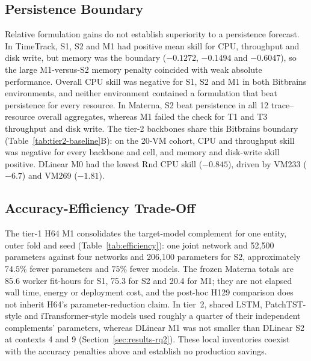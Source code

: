 \documentclass[5p,twocolumn]{elsarticle}
\begin{document}
\subsection{Persistence Boundary}
\label{sec:results-persistence}

Relative formulation gains do not establish superiority to a persistence
forecast. In TimeTrack, S1, S2 and M1 had positive mean skill for CPU,
throughput and disk write, but memory was the boundary ($-0.1272$, $-0.1494$
and $-0.6047$), so the large M1-versus-S2 memory penalty coincided with weak
absolute performance. Overall CPU skill was negative for S1, S2 and M1 in both
Bitbrains environments, and neither environment contained a formulation that
beat persistence for every resource. In Materna, S2 beat persistence in all 12
trace--resource overall aggregates, whereas M1 failed the check for T1 and T3
throughput and disk write.
The tier-2 backbones share this Bitbrains boundary
(Table~\ref{tab:tier2-baseline}B): on the 20-VM cohort, CPU and throughput
skill was negative for every backbone and cell, and memory and disk-write
skill positive. DLinear M0 had the lowest Rnd CPU skill ($-0.845$), driven
by VM233 ($-6.7$) and VM269 ($-1.81$).

\subsection{Accuracy-Efficiency Trade-Off}
\label{sec:results-efficiency}

The tier-1 H64 M1 consolidates the target-model complement for one entity,
outer fold and seed (Table~\ref{tab:efficiency}): one joint network and
52,500 parameters against four networks and 206,100 parameters for S2,
approximately $74.5\%$ fewer parameters and $75\%$ fewer models. The frozen
Materna totals are 85.6 worker fit-hours for S1, 75.3 for S2 and
20.4 for M1; they are not elapsed wall time, energy or deployment cost,
and the post-hoc H129 comparison does not inherit H64's parameter-reduction
claim. In tier~2, shared LSTM, PatchTST-style and iTransformer-style models
used roughly a quarter of their independent complements' parameters, whereas
DLinear M1 was not smaller than DLinear S2 at contexts 4 and 9
(Section~\ref{sec:results-rq2}). These local inventories coexist with the
accuracy penalties above and establish no production savings.
\end{document}
